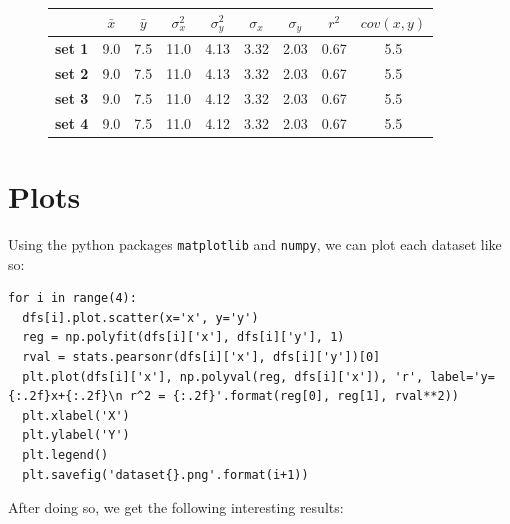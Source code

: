 \documentclass[11pt,a4paper]{article}
\begin{document}
\begin{figure}[]
\centering
\begin{tabular}{l|c|c|c|c|c|c|c|c|}
\cline{2-9}
                                     & \textbf{$\bar{x}$} & \textbf{$\bar{y}$} & \textbf{$\sigma_x^2$} & \textbf{$\sigma_y^2$} & \textbf{$\sigma_x$} & \textbf{$\sigma_y$} & \textbf{$r^2$} & \textbf{$cov(x, y)$} \\ \hline
\multicolumn{1}{|l|}{\textbf{set 1}} & 9.0                & 7.5              & 11.0                & 4.13                & 3.32                  & 2.03                  & 0.67           & 5.5                  \\ \hline
\multicolumn{1}{|l|}{\textbf{set 2}} & 9.0                & 7.5              & 11.0                & 4.13                & 3.32                  & 2.03                  & 0.67           & 5.5                  \\ \hline
\multicolumn{1}{|l|}{\textbf{set 3}} & 9.0                & 7.5              & 11.0                & 4.12                & 3.32                  & 2.03                  & 0.67           & 5.5                  \\ \hline
\multicolumn{1}{|l|}{\textbf{set 4}} & 9.0                & 7.5              & 11.0                & 4.12                & 3.32                  & 2.03                  & 0.67           & 5.5                  \\ \hline
\end{tabular}
\end{figure}

\section{Plots}

Using the python packages \texttt{matplotlib} and \texttt{numpy}, we can plot each dataset like so:

\begin{lstlisting}
for i in range(4):
  dfs[i].plot.scatter(x='x', y='y') 
  reg = np.polyfit(dfs[i]['x'], dfs[i]['y'], 1)
  rval = stats.pearsonr(dfs[i]['x'], dfs[i]['y'])[0]
  plt.plot(dfs[i]['x'], np.polyval(reg, dfs[i]['x']), 'r', label='y={:.2f}x+{:.2f}\n r^2 = {:.2f}'.format(reg[0], reg[1], rval**2))
  plt.xlabel('X')
  plt.ylabel('Y')
  plt.legend()
  plt.savefig('dataset{}.png'.format(i+1))
\end{lstlisting}

After doing so, we get the following interesting results:
\end{document}
